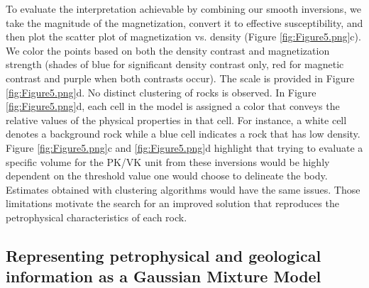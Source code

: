 \documentclass[paper, twocolumn]{geophysics} %
\begin{document}
To evaluate the interpretation achievable by combining our smooth inversions, we take the magnitude of the magnetization, convert it to effective susceptibility, and then plot the scatter plot of magnetization vs. density (Figure \ref{fig:Figure5.png}c). We color the points based on both the density contrast and magnetization strength (shades of blue for significant density contrast only, red for magnetic contrast and purple when both contrasts occur). The scale is provided in Figure \ref{fig:Figure5.png}d. No distinct clustering of rocks is observed. In Figure \ref{fig:Figure5.png}d, each cell in the model is assigned a color that conveys the relative values of the physical properties in that cell. For instance, a white cell denotes a background rock while a blue cell indicates a rock that has low density. Figure \ref{fig:Figure5.png}c and \ref{fig:Figure5.png}d highlight that trying to evaluate a specific volume for the PK/VK unit from these inversions would be highly dependent on the threshold value one would choose to delineate the body. Estimates obtained with clustering algorithms would have the same issues. Those limitations motivate the search for an improved solution that reproduces the petrophysical characteristics of each rock.


\subsection{Representing petrophysical and geological information as a Gaussian Mixture Model}

\end{document}
